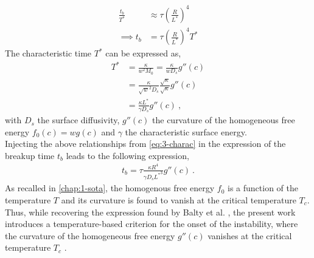 \begin{align}
    \frac{t_b}{T^*} &\approx \tau \left(\frac{R}{L^*}\right)^4\\
    \implies t_b &= \tau \left(\frac{R}{L^*}\right)^4 T^*
\end{align}
The characteristic time $T^*$ can be expressed as,
\begin{align}
    T^* &= \frac{\kappa}{w^2 M_0} = \frac{\kappa}{w D_s} g''(c) \\
    &= \frac{\kappa}{\sqrt{w}^2 D_s} \frac{\sqrt{\kappa}}{\sqrt{\kappa}} g''(c)\\
    &= \frac{\kappa L^*}{\gamma D_s} g''(c)\ ,
\end{align}
with $D_s$ the surface diffusivity, $g''(c)$ the curvature of the homogeneous free energy $f_0(c)=wg(c)$ and $\gamma$ the characteristic surface energy.\\
Injecting the above relationships from \autoref{eq:3-charac} in the expression of the breakup time $t_b$ leads to the following expression,
\begin{align}
    t_b = \tau \frac{\kappa R^4}{\gamma D_s {L^*}^3} g''(c)\ .
\end{align}
As recalled in \autoref{chap:1-sota}, the homogenous free energy $f_0$ is a function of the temperature $T$ and its curvature is found to vanish at the critical temperature $T_c$. Thus, while recovering the expression found by Balty et al. \cite{BaltyBaretSilhanekNguyen2024}, the present work introduces a temperature-based criterion for the onset of the instability, where the curvature of the homogeneous free energy $g''(c)$ vanishes at the critical temperature $T_c$ \cite{Cahn1959,LeeHuhJeongShinYunKim2014}.

